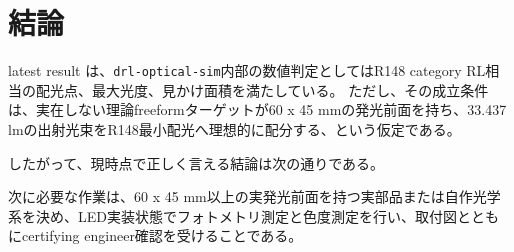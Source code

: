 \documentclass[11pt,a4paper]{article}
\newcommand{\code}[1]{\texttt{#1}}
\begin{document}
\section{結論}
latest result は、\code{drl-optical-sim}内部の数値判定としてはR148 category RL相当の配光点、最大光度、見かけ面積を満たしている。
ただし、その成立条件は、実在しない理論freeformターゲットが60 x 45 mmの発光前面を持ち、33.437 lmの出射光束をR148最小配光へ理想的に配分する、という仮定である。

したがって、現時点で正しく言える結論は次の通りである。

\begin{center}
\end{center}

次に必要な作業は、60 x 45 mm以上の実発光前面を持つ実部品または自作光学系を決め、LED実装状態でフォトメトリ測定と色度測定を行い、取付図とともにcertifying engineer確認を受けることである。
\end{document}
